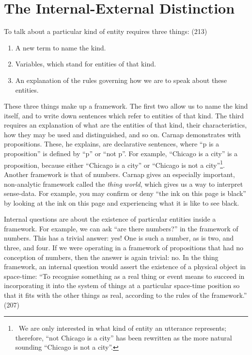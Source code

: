 \documentclass[12pt]{article}
\begin{document}
\section{The Internal-External Distinction}

To talk about a particular kind of entity requires three things: (213)

\begin{enumerate}
	\item A new term to name the kind.
	\item Variables, which stand for entities of that kind.
	\item An explanation of the rules governing how we are to speak about these entities.
\end{enumerate}

These three things make up a framework. The first two allow us to name the kind itself, and to write down sentences which refer to entities of that kind. The third requires an explanation of what are the entities of that kind, their characteristics, how they may be used and distinguished, and so on. Carnap demonstrates with propositions. These, he explains, are declarative sentences, where ``p is a proposition'' is defined by ``p'' or ``not p''. For example, ``Chicago is a city'' is a proposition, because either ``Chicago is a city'' or ``Chicago is not a city''\footnote{~We are only interested in what kind of entity an utterance represents; therefore, ``not Chicago is a city'' has been rewritten as the more natural sounding ``Chicago is not a city''.}. Another framework is that of numbers. Carnap gives an especially important, non-analytic framework called the \textit{thing world}, which gives us a way to interpret sense-data. For example, you may confirm or deny ``the ink on this page is black'' by looking at the ink on this page and experiencing what it is like to see black.

Internal questions are about the existence of particular entities inside a framework. For example, we can ask ``are there numbers?'' in the framework of numbers. This has a trivial answer: yes! One is such a number, as is two, and three, and four. If we were operating in a framework of propositions that had no conception of numbers, then the answer is again trivial: no. In the thing framework, an internal question would assert the existence of a physical object in space-time: ``To recognise something as a real thing or event means to succeed in incorporating it into the system of things at a particular space-time position so that it fits with the other things as real, according to the rules of the framework.'' (207)
\end{document}
